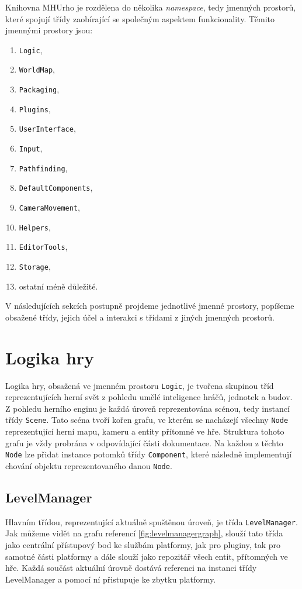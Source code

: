 Knihovna MHUrho je rozdělena do několika \textit{namespace}, tedy jmenných prostorů, které spojují třídy zaobírající se společným aspektem funkcionality. Těmito jmennými prostory jsou:
\begin{enumerate}
	\item \texttt{Logic},
	\item \texttt{WorldMap},
	\item \texttt{Packaging},
	\item \texttt{Plugins},
	\item \texttt{UserInterface},
	\item \texttt{Input},
	\item \texttt{Pathfinding},
	\item \texttt{DefaultComponents},
	\item \texttt{CameraMovement},
	\item \texttt{Helpers},
	\item \texttt{EditorTools},
	\item \texttt{Storage},
	\item ostatní méně důležité.
\end{enumerate}

V následujících sekcích postupně projdeme jednotlivé jmenné prostory, popíšeme obsažené třídy, jejich účel a interakci s třídami z jiných jmenných prostorů.

\section{Logika hry}
Logika hry, obsažená ve jmenném prostoru \texttt{Logic}, je tvořena skupinou tříd reprezentujících herní svět z pohledu umělé inteligence hráčů, jednotek a budov. 
Z pohledu herního enginu je každá úroveň reprezentována scénou, tedy instancí třídy \texttt{Scene}. Tato scéna tvoří kořen grafu, ve kterém se nacházejí všechny \texttt{Node} reprezentující herní mapu, kameru a entity přítomné ve hře. Struktura tohoto grafu je vždy probrána v odpovídající části dokumentace. Na každou z těchto \texttt{Node} lze přidat instance potomků třídy \texttt{Component}, které následně implementují chování objektu reprezentovaného danou \texttt{Node}.

\subsection{LevelManager}
Hlavním třídou, reprezentující aktuálně spuštěnou úroveň, je třída \texttt{LevelManager}. Jak můžeme vidět na grafu referencí \ref{fig:levelmanagergraph}, slouží tato třída jako centrální přístupový bod ke službám platformy, jak pro pluginy, tak pro samotné části platformy a dále slouží jako repozitář všech entit, přítomných ve hře. Každá součást aktuální úrovně dostává referenci na instanci třídy LevelManager a pomocí ní přistupuje ke zbytku platformy.

